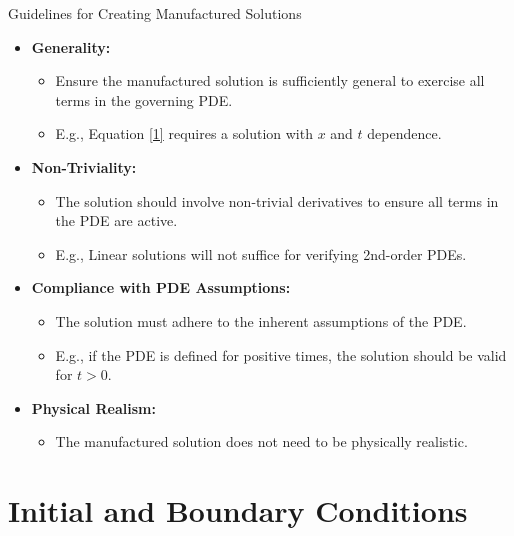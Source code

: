 \documentclass{beamer}
\begin{document}
\begin{frame}{Guidelines for Creating Manufactured Solutions}
    \begin{itemize}
        \item \textbf{Generality:}
            \begin{itemize}
                \item Ensure the manufactured solution is sufficiently general to exercise all terms in the governing PDE.
                \item E.g., Equation \ref{1} requires a solution with $x$ and $t$ dependence.
            \end{itemize}
        \item \textbf{Non-Triviality:}
        \begin{itemize}
            \item The solution should involve non-trivial derivatives to ensure all terms in the PDE are active.
            \item E.g., Linear solutions will not suffice for verifying 2nd-order PDEs.
        \end{itemize}
        \item \textbf{Compliance with PDE Assumptions:}
            \begin{itemize}
                \item The solution must adhere to the inherent assumptions of the PDE.
                \item E.g., if the PDE is defined for positive times, the solution should be valid for $t > 0$.
            \end{itemize}
        \item \textbf{Physical Realism:}
            \begin{itemize}
                \item The manufactured solution does not need to be physically realistic.
            \end{itemize}
    \end{itemize}
\end{frame}

\section{Initial and Boundary Conditions}
\end{document}
